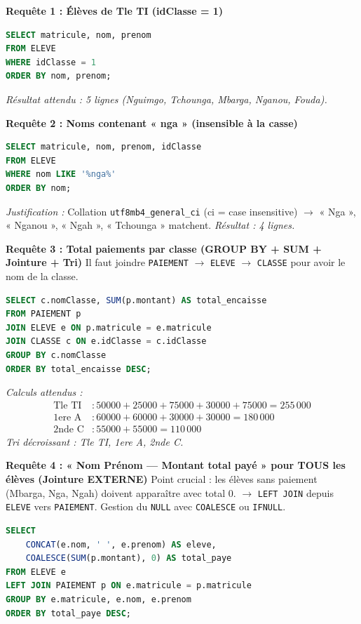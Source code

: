 \documentclass[11pt]{article}
\begin{document}
\begin{exoresolu}
\noindent\textbf{Requête 1 : Élèves de Tle TI (idClasse = 1)}
\begin{lstlisting}[language=SQL]
SELECT matricule, nom, prenom
FROM ELEVE
WHERE idClasse = 1
ORDER BY nom, prenom;
\end{lstlisting}
\textit{Résultat attendu : 5 lignes (Nguimgo, Tchounga, Mbarga, Nganou, Fouda).}

\noindent\textbf{Requête 2 : Noms contenant « nga » (insensible à la casse)}
\begin{lstlisting}[language=SQL]
SELECT matricule, nom, prenom, idClasse
FROM ELEVE
WHERE nom LIKE '%nga%'
ORDER BY nom;
\end{lstlisting}
\textit{Justification :} Collation \texttt{utf8mb4\_general\_ci} (ci = case insensitive) $\to$ « Nga », « Nganou », « Ngah », « Tchounga » matchent. \textit{Résultat : 4 lignes.}

\noindent\textbf{Requête 3 : Total paiements par classe (GROUP BY + SUM + Jointure + Tri)}
Il faut joindre \texttt{PAIEMENT} $\to$ \texttt{ELEVE} $\to$ \texttt{CLASSE} pour avoir le nom de la classe.
\begin{lstlisting}[language=SQL]
SELECT c.nomClasse, SUM(p.montant) AS total_encaisse
FROM PAIEMENT p
JOIN ELEVE e ON p.matricule = e.matricule
JOIN CLASSE c ON e.idClasse = c.idClasse
GROUP BY c.nomClasse
ORDER BY total_encaisse DESC;
\end{lstlisting}
\textit{Calculs attendus :}
\begin{align*}
\text{Tle TI}  &: 50000 + 25000 + 75000 + 30000 + 75000 = 255\,000 \\
\text{1ere A}  &: 60000 + 60000 + 30000 + 30000 = 180\,000 \\
\text{2nde C}  &: 55000 + 55000 = 110\,000
\end{align*}
\textit{Tri décroissant : Tle TI, 1ere A, 2nde C.}

\noindent\textbf{Requête 4 : « Nom Prénom — Montant total payé » pour TOUS les élèves (Jointure EXTERNE)}
Point crucial : les élèves sans paiement (Mbarga, Nga, Ngah) doivent apparaître avec total 0. $\to$ \texttt{LEFT JOIN} depuis \texttt{ELEVE} vers \texttt{PAIEMENT}. Gestion du \texttt{NULL} avec \texttt{COALESCE} ou \texttt{IFNULL}.
\begin{lstlisting}[language=SQL]
SELECT 
    CONCAT(e.nom, ' ', e.prenom) AS eleve,
    COALESCE(SUM(p.montant), 0) AS total_paye
FROM ELEVE e
LEFT JOIN PAIEMENT p ON e.matricule = p.matricule
GROUP BY e.matricule, e.nom, e.prenom
ORDER BY total_paye DESC;
\end{lstlisting}


\end{exoresolu}
\end{document}

